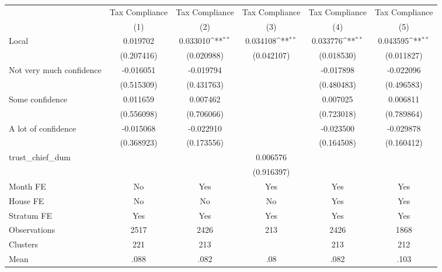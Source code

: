{
\def\sym#1{\ifmmode^{#1}\else\(^{#1}\)\fi}
\begin{tabular}{l*{5}{c}}
\toprule
                &\multicolumn{1}{c}{Tax Compliance}&\multicolumn{1}{c}{Tax Compliance}&\multicolumn{1}{c}{Tax Compliance}&\multicolumn{1}{c}{Tax Compliance}&\multicolumn{1}{c}{Tax Compliance}\\
                &\multicolumn{1}{c}{(1)}         &\multicolumn{1}{c}{(2)}         &\multicolumn{1}{c}{(3)}         &\multicolumn{1}{c}{(4)}         &\multicolumn{1}{c}{(5)}         \\
\midrule
Local           & 0.019702         & 0.033010\sym{**} & 0.034108\sym{**} & 0.033776\sym{**} & 0.043595\sym{**} \\
                &(0.207416)         &(0.020988)         &(0.042107)         &(0.018530)         &(0.011827)         \\
Not very much confidence&-0.016051         &-0.019794         &                  &-0.017898         &-0.022096         \\
                &(0.515309)         &(0.431763)         &                  &(0.480483)         &(0.496583)         \\
Some confidence & 0.011659         & 0.007462         &                  & 0.007025         & 0.006811         \\
                &(0.556098)         &(0.706066)         &                  &(0.723018)         &(0.789864)         \\
A lot of confidence&-0.015068         &-0.022910         &                  &-0.023500         &-0.029878         \\
                &(0.368923)         &(0.173556)         &                  &(0.164508)         &(0.160412)         \\
trust\_chief\_dum &                  &                  & 0.006576         &                  &                  \\
                &                  &                  &(0.916397)         &                  &                  \\
Month FE        &       No         &      Yes         &      Yes         &      Yes         &      Yes         \\
House FE        &       No         &       No         &       No         &      Yes         &      Yes         \\
Stratum FE      &      Yes         &      Yes         &      Yes         &      Yes         &      Yes         \\
\midrule
Observations    &     2517         &     2426         &      213         &     2426         &     1868         \\
Clusters        &      221         &      213         &                  &      213         &      212         \\
Mean            &     .088         &     .082         &      .08         &     .082         &     .103         \\
\bottomrule
\end{tabular}
}
